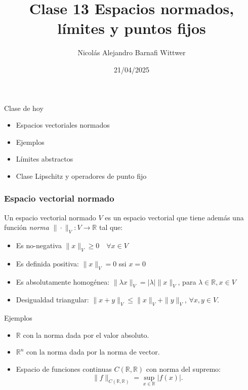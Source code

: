 \documentclass[12pt,aspectratio=169,xcolor=dvipsnames]{beamer}
\title[short title]{Clase 13 Espacios normados, límites y puntos fijos}
\subtitle{}
\author[NA Barnafi] {Nicolás Alejandro Barnafi Wittwer}
\institute[UC|CMM] 
{
    Pontificia Universidad Católica de Chile \\
    Centro de Modelamiento Matemático
}
\date{21/04/2025}
\newcommand{\R}{\mathbb{R}}
\begin{document}
\begin{frame}
    \maketitle
\end{frame}
\begin{frame}{Clase de hoy}
    \begin{itemize}
        \item Espacios vectoriales normados
        \item Ejemplos
        \item Límites abstractos
        \item Clase Lipschitz y operadores de punto fijo
    \end{itemize}

    \vspace{1cm}
\end{frame}
\begin{frame}\frametitle{Espacio vectorial normado}
    Un espacio vectorial normado $V$ es un espacio vectorial que tiene además una función \emph{norma} $\|\cdot\|_V:V \to \R$ tal que: 
    \begin{itemize}
        \item Es no-negativa $\|x\|_V\geq 0\quad\forall x \in V$
        \item Es definida positiva: $\|x\|_V=0$ ssi $x=0$ 
        \item Es absolutamente homogénea: $\|\lambda x\|_V = |\lambda| \|x\|_V$, para $\lambda \in \R, x\in V$
        \item Desigualdad triangular: $\|x+y\|_V \leq \|x\|_V + \|y \|_V$, $\forall x,y \in V$. 
    \end{itemize}

\end{frame}
\begin{frame}{Ejemplos}
    \begin{itemize}
        \item $\R$ con la norma dada por el valor absoluto.
        \item $\R^n$ con la norma dada por la norma de vector.
        \item Espacio de funciones continuas $C(\R,\R)$ con norma del supremo: 
            $$ \| f \|_{C(\R,\R)} = \sup_{x\in \R}|f(x)|. $$
    \end{itemize}
\end{frame}
\end{document}
